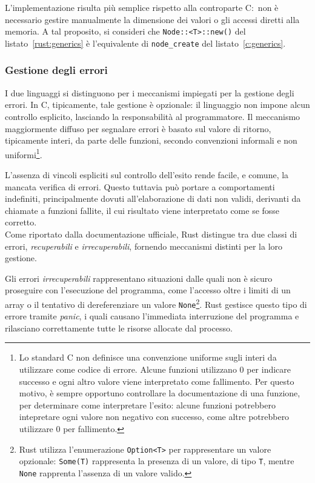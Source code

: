 L'implementazione risulta più semplice rispetto alla controparte C:\ non è necessario gestire manualmente la dimensione dei valori o gli accessi diretti alla memoria.
A tal proposito, si consideri che \texttt{Node::<T>::new()} del listato~\ref{rust:generics} è l'equivalente di \texttt{node\_create} del listato~\ref{c:generics}.

\subsubsection{Gestione degli errori}
I due linguaggi si distinguono per i meccanismi impiegati per la gestione degli errori.
In C, tipicamente, tale gestione è opzionale: il linguaggio non impone alcun controllo esplicito, lasciando la responsabilità al programmatore.
Il meccanismo maggiormente diffuso per segnalare errori è basato sul valore di ritorno, tipicamente interi, da parte delle funzioni, secondo
convenzioni informali e non uniformi\footnote{Lo standard C non definisce una convenzione uniforme sugli interi da utilizzare come codice di errore. Alcune funzioni
utilizzano 0 per indicare successo e ogni altro valore viene interpretato come fallimento. Per questo motivo, è sempre opportuno controllare la documentazione di una funzione,
per determinare come interpretare l'esito: alcune funzioni potrebbero intepretare ogni valore non negativo con successo, come altre potrebbero utilizzare 0 per fallimento.}.

L'assenza di vincoli espliciti sul controllo dell'esito rende facile, e comune, la mancata verifica di errori. 
Questo tuttavia può portare a comportamenti indefiniti, principalmente dovuti all'elaborazione di dati non validi, derivanti da
chiamate a funzioni fallite, il cui risultato viene interpretato come se fosse corretto. \hfill
\vspace{9pt}\\
\noindent Come riportato dalla documentazione ufficiale\cite{rust-book}, Rust distingue tra due classi di errori, 
\textit{recuperabili} e \textit{irrecuperabili}, fornendo meccanismi distinti per la loro gestione.

Gli errori \textit{irrecuperabili} rappresentano situazioni dalle quali non è sicuro proseguire con l'esecuzione del programma, come l'accesso oltre i limiti di un array o 
il tentativo di dereferenziare un valore \texttt{None}\footnote{Rust utilizza l'enumerazione \texttt{Option<T>} per rappresentare un valore opzionale: \texttt{Some(T)} rappresenta la presenza di un valore, di tipo \texttt{T}, mentre \texttt{None} rapprenta l'assenza di un valore valido.}. 
Rust gestisce questo tipo di errore tramite \textit{panic}, i quali causano l'immediata interruzione del programma e rilasciano correttamente
tutte le risorse allocate dal processo.

